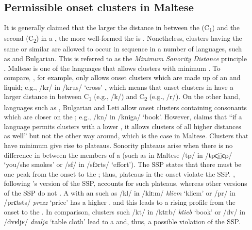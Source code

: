 \documentclass[output=paper]{langsci/langscibook}
\begin{document}
\subsection{Permissible onset clusters in Maltese}

It is generally claimed that the larger the distance in  between the  (C\textsubscript{1}) and the second  (C\textsubscript{2}) in a , the more well-formed the  is \citep{topintzi2011}. Nonetheless, clusters having the same or similar  are allowed to occur in sequence in a number of languages, such as  and Bulgarian. This is referred to as the \textit{Minimum Sonority Distance} principle \citep[cf.][]{selkirk1984major,levin1985metrical, parker2011}. Maltese is one of the languages that allows clusters with minimum . To compare, , for example, only allows onset clusters which are made up of an  and liquid; e.g., /kr/ in /krus/ ‘cross’ \citep{baertsch2002}, which means that onset clusters in  have a larger distance in  between C\textsubscript{1} (e.g., /k/) and C\textsubscript{2} (e.g., /r/). On the other hand, languages such as , Bulgarian and Leti allow onset clusters containing consonants which are closer on the ; e.g., /kn/ in  /kniga/ ‘book’. However, \citet[1168]{parker2011} claims that “if a language permits clusters with a lower , it allows clusters of all higher distances as well” but not the other way around, which is the case in Maltese. Clusters that have minimum  give rise to plateaus. Sonority plateaus arise when there is no difference in  between the members of a  (such as in Maltese /tp/ in /tpɛjjɛp/ ‘you/she smokes’ or /sf/ in /sfɔrts/ ‘effort’). The SSP states that there must be one peak from the onset to the ; thus, plateaus in the onset violate the SSP. \citet{blevins1995}, following \citet{otto1904}’s version of the SSP, accounts for such plateaus, whereas other versions of the SSP do not \citep[e.g.][]{selkirk1984major,clements1990role, zec2007syllable}. A  with an  such as /kl/ in /klɪ:m/ \textit{kliem} ‘kliem’ or /pr/ in /prɛtsts/ \textit{prezz} ‘price’ has a higher , and this leads to a rising  profile from the onset to the . In comparison,  clusters such /kt/ in /ktɪ:b/ \textit{ktieb} ‘book’ or /dv/ in /dvɐljɐ/ \textit{dvalja} ‘table cloth’ lead to a  and, thus, a possible violation of the SSP.  
\end{document}
